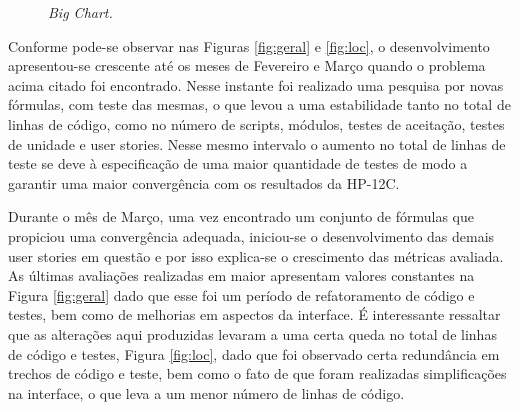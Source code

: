\begin{figure}[!h]
 \caption{\it Big Chart.} \label{fig:bigchart}
\end{figure}

Conforme pode-se observar nas Figuras \ref{fig:geral} e \ref{fig:loc}, o desenvolvimento apresentou-se crescente até os meses de Fevereiro e Março quando o problema acima citado foi encontrado. Nesse instante foi realizado uma pesquisa por novas fórmulas, com teste das mesmas, o que levou a uma estabilidade tanto no total de linhas de código, como no número de scripts, módulos, testes de aceitação, testes de unidade e user stories. Nesse mesmo intervalo o aumento no total de linhas de teste se deve à especificação de uma maior quantidade de testes de modo a garantir uma maior convergência com os resultados da HP-12C.

Durante o mês de Março, uma vez encontrado um conjunto de fórmulas que propiciou uma convergência adequada, iniciou-se o desenvolvimento das demais user stories em questão e por isso explica-se o crescimento das métricas avaliada. As últimas avaliações realizadas em maior apresentam valores constantes na Figura \ref{fig:geral} dado que esse foi um período de refatoramento de código e testes, bem como de melhorias em aspectos da interface. É interessante ressaltar que as alterações aqui produzidas levaram a uma certa queda no total de linhas de código e testes, Figura \ref{fig:loc}, dado que foi observado certa redundância em trechos de código e teste, bem como o fato de que foram realizadas simplificações na interface, o que leva a um menor número de linhas de código.

